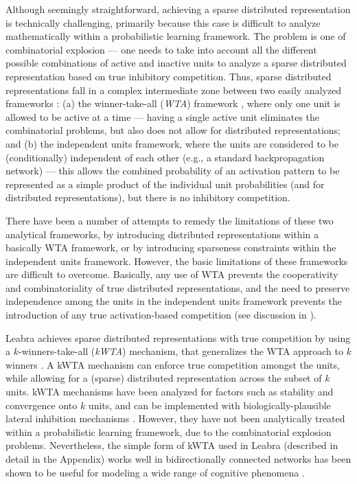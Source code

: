 \documentclass[12pt,twoside]{article}
\begin{document}
Although seemingly straightforward, achieving a sparse distributed
representation is technically challenging, primarily because this case
is difficult to analyze mathematically within a probabilistic learning
framework.  The problem is one of combinatorial explosion --- one
needs to take into account all the different possible combinations of
active and inactive units to analyze a sparse distributed
representation based on true inhibitory competition.  Thus, sparse
distributed representations fall in a complex intermediate zone
between two easily analyzed frameworks \cite{HintonGhahramani97}: (a)
the winner-take-all ({\em WTA}) framework
\cite{RumelhartZipser86,Grossberg76,Nowlan90}, where only one unit is
allowed to be active at a time --- having a single active unit
eliminates the combinatorial problems, but also does not allow for
distributed representations; and (b) the independent units framework,
where the units are considered to be (conditionally) independent of
each other (e.g., a standard backpropagation network) --- this allows
the combined probability of an activation pattern to be represented as
a simple product of the individual unit probabilities (and for
distributed representations), but there is no inhibitory competition.

There have been a number of attempts to remedy the limitations of
these two analytical frameworks, by introducing distributed
representations within a basically WTA framework, or by introducing
sparseness constraints within the independent units framework.
However, the basic limitations of these frameworks are difficult to
overcome.  Basically, any use of WTA prevents the cooperativity and
combinatoriality of true distributed representations, and the need to
preserve independence among the units in the independent units
framework prevents the introduction of any true activation-based
competition (see discussion in ).

Leabra achieves sparse distributed representations with true
competition by using a $k$-winners-take-all ({\em kWTA}) mechanism,
that generalizes the WTA approach to $k$ winners
\cite{MajaniErlarsonAbuMostafa89}.  A kWTA mechanism can enforce true
competition amongst the units, while allowing for a (sparse)
distributed representation across the subset of $k$ units.  kWTA
mechanisms have been analyzed for factors such as stability and
convergence onto $k$ units, and can be implemented with
biologically-plausible lateral inhibition mechanisms
\cite{MajaniErlarsonAbuMostafa89,FukaiTanaka97}.  However, they have
not been analytically treated within a probabilistic learning
framework, due to the combinatorial explosion problems.  Nevertheless,
the simple form of kWTA used in Leabra (described in detail in the
Appendix) works well in bidirectionally connected networks has been
shown to be useful for modeling a wide range of cognitive phenomena
\cite{OReillyMunakata00}.
\end{document}
